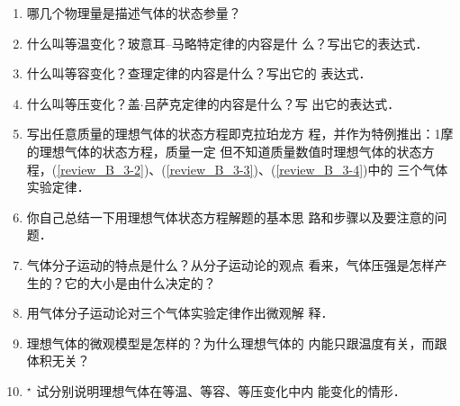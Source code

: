 \begin{enumerate}
	\item 
	哪几个物理量是描述气体的状态参量？
	
	\item \label{review_B_3-2}
	什么叫等温变化？玻意耳--马略特定律的内容是什
	么？写出它的表达式．
	
	\item \label{review_B_3-3}
	什么叫等容变化？查理定律的内容是什么？写出它的
	表达式．
	
	\item \label{review_B_3-4}
	什么叫等压变化？盖$\cdot$吕萨克定律的内容是什么？写
	出它的表达式．
	
	\item 
	写出任意质量的理想气体的状态方程即克拉珀龙方
	程，并作为特例推出：1摩的理想气体的状态方程，质量一定
	但不知道质量数值时理想气体的状态方程，(\ref{review_B_3-2})、(\ref{review_B_3-3})、(\ref{review_B_3-4})中的
	三个气体实验定律．
	
	
	
	\item 
	你自己总结一下用理想气体状态方程解题的基本思
	路和步骤以及要注意的问题．
	
	\item 
	气体分子运动的特点是什么？从分子运动论的观点
	看来，气体压强是怎样产生的？它的大小是由什么决定的？
	
	\item 
	用气体分子运动论对三个气体实验定律作出微观解
	释．
	
	\item 
	理想气体的微观模型是怎样的？为什么理想气体的
	内能只跟温度有关，而跟体积无关？
	
	\item$^\star$ 
	试分别说明理想气体在等温、等容、等压变化中内
	能变化的情形．
	
\end{enumerate}


